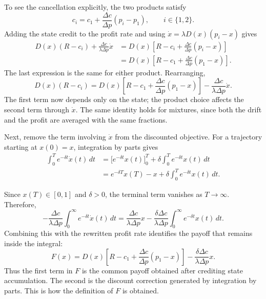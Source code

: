 \documentclass[11pt]{article}
\begin{document}
To see the cancellation explicitly, the two products satisfy
\begin{equation*}
c_i=c_1+\frac{\Delta c}{\Delta p}(p_i-p_1),
\qquad i\in\{1,2\}.
\end{equation*}
Adding the state credit to the profit rate and using
$\dot x=\lambda D(x)(p_i-x)$ gives
\begin{align*}
D(x)(R-c_i)+\frac{\Delta c}{\lambda\Delta p}\dot x
&=D(x)\left[R-c_i+\frac{\Delta c}{\Delta p}(p_i-x)\right]\\
&=D(x)\left[R-c_1+\frac{\Delta c}{\Delta p}(p_1-x)\right].
\end{align*}
The last expression is the same for either product. Rearranging,
\begin{equation*}
D(x)(R-c_i)
=D(x)\left[R-c_1+\frac{\Delta c}{\Delta p}(p_1-x)\right]
-\frac{\Delta c}{\lambda\Delta p}\dot x.
\end{equation*}
The first term now depends only on the state; the product choice affects
the second term through $\dot x$. The same identity holds for mixtures,
since both the drift and the profit are averaged with the same fractions.

Next, remove the term involving $\dot x$ from the discounted objective.
For a trajectory starting at $x(0)=x$, integration by parts gives
\begin{align*}
\int_0^T e^{-\delta t}\dot x(t)\,dt
&=\bigl[e^{-\delta t}x(t)\bigr]_0^T
+\delta\int_0^T e^{-\delta t}x(t)\,dt\\
&=e^{-\delta T}x(T)-x
+\delta\int_0^T e^{-\delta t}x(t)\,dt.
\end{align*}

Since $x(T)\in[0,1]$ and $\delta>0$, the terminal term vanishes as
$T\to\infty$. Therefore,
\begin{equation*}
-\frac{\Delta c}{\lambda\Delta p}
\int_0^\infty e^{-\delta t}\dot x(t)\,dt
=\frac{\Delta c}{\lambda\Delta p}x
-\frac{\delta\Delta c}{\lambda\Delta p}
\int_0^\infty e^{-\delta t}x(t)\,dt.
\end{equation*}
Combining this with the rewritten profit rate identifies the payoff
that remains inside the integral:
\begin{equation}\label{eq:F}
F(x)=D(x)\left[R-c_1+\frac{\Delta c}{\Delta p}(p_1-x)\right]
       -\frac{\delta\Delta c}{\lambda\Delta p}x.
\end{equation}
Thus the first term in $F$ is the common payoff obtained after crediting
state accumulation. The second is the discount correction generated by
integration by parts. This is how the definition of $F$ is obtained.
\end{document}

